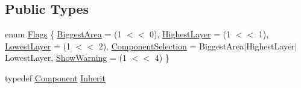 \subsection*{Public Types}
\begin{DoxyCompactItemize}
\item 
enum \mbox{\hyperlink{classHurricane_1_1RoutingPad_a69f37f0b06b9bfd758d9be42c71e2bd4}{Flags}} \{ \newline
\mbox{\hyperlink{classHurricane_1_1RoutingPad_a69f37f0b06b9bfd758d9be42c71e2bd4add72642d150e901835fa7d66d40e327d}{Biggest\+Area}} = (1 $<$$<$ 0), 
\newline
\mbox{\hyperlink{classHurricane_1_1RoutingPad_a69f37f0b06b9bfd758d9be42c71e2bd4a8f7993760a105713a97abdfb05eee852}{Highest\+Layer}} = (1 $<$$<$ 1), 
\newline
\mbox{\hyperlink{classHurricane_1_1RoutingPad_a69f37f0b06b9bfd758d9be42c71e2bd4a14c89f0c4ca6f4108b7f2ac30ab885a6}{Lowest\+Layer}} = (1 $<$$<$ 2), 
\newline
\mbox{\hyperlink{classHurricane_1_1RoutingPad_a69f37f0b06b9bfd758d9be42c71e2bd4aa2db526191b29a7e094bff309e27ef4c}{Component\+Selection}} = Biggest\+Area$\vert$\+Highest\+Layer$\vert$\+Lowest\+Layer, 
\newline
\mbox{\hyperlink{classHurricane_1_1RoutingPad_a69f37f0b06b9bfd758d9be42c71e2bd4a8fd74358022a29aab828700c8f7347ba}{Show\+Warning}} = (1 $<$$<$ 4)
 \}
\item 
typedef \mbox{\hyperlink{classHurricane_1_1Component}{Component}} \mbox{\hyperlink{classHurricane_1_1RoutingPad_a53bed3713fe846a351621d2022bc6b68}{Inherit}}
\end{DoxyCompactItemize}
